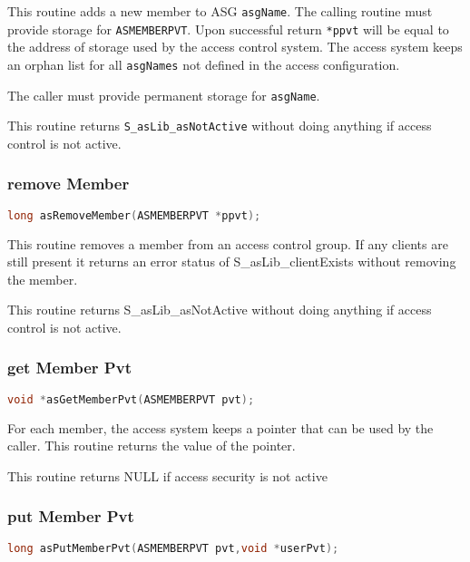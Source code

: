 This routine adds a new member to ASG \verb|asgName|. The calling routine must provide storage for \verb|ASMEMBERPVT|. Upon 
successful return \verb|*ppvt| will be equal to the address of storage used by the access control system. The access system 
keeps an orphan list for all \verb|asgNames| not defined in the access configuration.

The caller must provide permanent storage for \verb|asgName|.

This routine returns \verb|S_asLib_asNotActive| without doing anything if access control is not active.

\subsubsection{remove Member}

\begin{lstlisting}[language=C]
long asRemoveMember(ASMEMBERPVT *ppvt);
\end{lstlisting}

This routine removes a member from an access control group. If any clients are still present it returns an error status of 
S\_asLib\_clientExists without removing the member.

This routine returns S\_asLib\_asNotActive without doing anything if access control is not active.

\subsubsection{get Member Pvt}

\begin{lstlisting}[language=C]
void *asGetMemberPvt(ASMEMBERPVT pvt);
\end{lstlisting}

For each member, the access system keeps a pointer that can be used by the caller. This routine returns the value of the 
pointer.

This routine returns NULL if access security is not active 

\subsubsection{put Member Pvt}

\begin{lstlisting}[language=C]
long asPutMemberPvt(ASMEMBERPVT pvt,void *userPvt);
\end{lstlisting}

